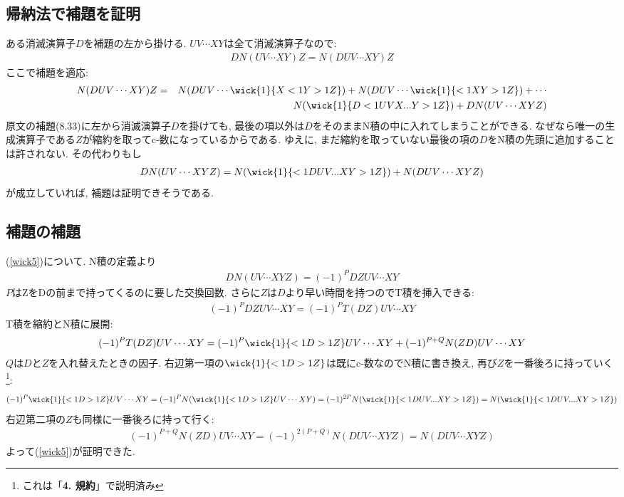 \documentclass[10.5pt,a4paper]{jreport}
\begin{document}
\subsection{帰納法で補題を証明}
ある消滅演算子$D$を補題の左から掛ける. $UV\cdots XY$は全て消滅演算子なので:
\begin{eqnarray}
  DN(UV\cdots XY)Z = N(DUV\cdots XY)Z
\end{eqnarray}
ここで補題を適応:
\begin{eqnarray}
\nonumber  N(DUV\cdots XY)Z &=& N(DUV\cdots \wick{1}{X <1Y >1Z}) + N(DUV\cdots \wick{1}{<1X Y >1Z}) + \cdots \\
  && N(\wick{1}{D<1UVX... Y >1Z}) + DN(UV\cdots XYZ)
\end{eqnarray}
原文の補題(8.33)に左から消滅演算子$D$を掛けても, 最後の項以外は$D$をそのままN積の中に入れてしまうことができる. なぜなら唯一の生成演算子である$Z$が縮約を取ってc-数になっているからである. ゆえに, まだ縮約を取っていない最後の項の$D$をN積の先頭に追加することは許されない. その代わりもし
\begin{eqnarray}
  DN(UV\cdots XYZ) = N(\wick{1}{<1DUV... XY>1Z}) + N(DUV\cdots XYZ)\label{wick5}
\end{eqnarray}
が成立していれば, 補題は証明できそうである. 

\subsection{補題の補題}
(\ref{wick5})について. N積の定義より
\begin{eqnarray}
  DN(UV\cdots XYZ) = (-1)^PDZUV\cdots XY
\end{eqnarray}
$P$はZをDの前まで持ってくるのに要した交換回数. さらに$Z$は$D$より早い時間を持つのでT積を挿入できる:
\begin{eqnarray}
  (-1)^PDZUV\cdots XY = (-1)^PT(DZ)UV\cdots XY  
\end{eqnarray}
T積を縮約とN積に展開:
\begin{eqnarray}
  (-1)^PT(DZ)UV\cdots XY = (-1)^P\wick{1}{<1D >1Z}UV\cdots XY + (-1)^{P+Q}N(ZD)UV\cdots XY
\end{eqnarray}
$Q$は$D$と$Z$を入れ替えたときの因子. 右辺第一項の$\wick{1}{<1D >1Z}$は既にc-数なのでN積に書き換え, 再び$Z$を一番後ろに持っていく\footnote{これは「\textbf{4. 規約}」で説明済み}:
\begin{eqnarray}
  (-1)^P\wick{1}{<1D >1Z}UV\cdots XY = (-1)^PN(\wick{1}{<1D >1Z}UV\cdots XY) = (-1)^{2P}N(\wick{1}{<1D UV... XY >1Z}) = N(\wick{1}{<1D UV... XY >1Z})
\end{eqnarray}
右辺第二項の$Z$も同様に一番後ろに持って行く:
\begin{eqnarray}
  (-1)^{P+Q}N(ZD)UV\cdots XY = (-1)^{2(P+Q)}N(DUV\cdots XYZ)= N(DUV\cdots XYZ)
\end{eqnarray}
よって(\ref{wick5})が証明できた. 
\end{document}
